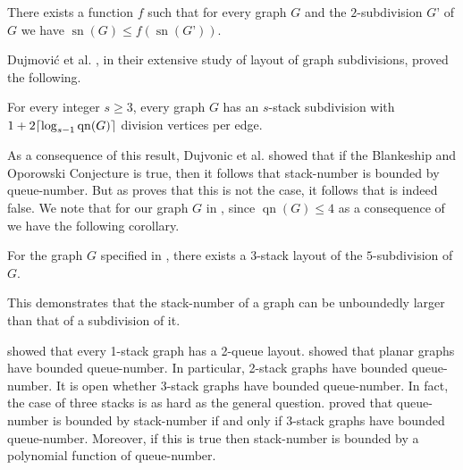 \documentclass[kpfonts]{patmorin}
\DeclareMathOperator{\sn}{sn}
\DeclareMathOperator{\qn}{qn}
\renewcommand{\leq}{\leqslant}
\renewcommand{\geq}{\geqslant}
\begin{document}
\begin{conj}\label{B_conj}\citep{BO99,BO01}
	There exists a function $f$ such that for every graph $G$ and the $2$-subdivision $G’$ of $G$ we have $\sn(G) \leq f(\sn(G’))$.
\end{conj}

Dujmovi\'c et al. \cite{DujWoo05}, in their extensive study of layout of graph subdivisions, proved the following.

\begin{thm}\label{sub_thm} \cite{DujWoo05}
	For every integer $s \geq 3$, every graph $G$ has an $s$-stack subdivision with $1+2 \ceil{\log_{s-1}\qn(G)}$ division vertices per edge.
\end{thm}


As a consequence of this result, Dujvonic et al. showed that if the Blankeship and Oporowski Conjecture is true, then it follows that stack-number is bounded by queue-number. But as  proves that this is not the case, it follows that  is indeed false. We note that for our graph $G$ in , since $\qn(G) \leq 4$ as a consequence of  we have the following corollary.

\begin{cor}
	For the graph $G$ specified in , there exists a $3$-stack layout of the $5$-subdivision of $G$.
\end{cor}

This demonstrates that the stack-number of a graph can be unboundedly larger than that of a subdivision of it.


%
%
%
%
%



\citet{HLR92} showed that every 1-stack graph has a 2-queue layout. \citet{DJMMUW20} showed that planar graphs have bounded queue-number. In particular, 2-stack graphs have bounded queue-number. It is open whether 3-stack graphs have bounded queue-number. In fact, the case of three stacks is as hard as the general question. \citet{DujWoo05} proved that queue-number is bounded by stack-number if and only if 3-stack graphs have bounded queue-number. Moreover, if this is true then stack-number is bounded by a polynomial function of queue-number.




\end{document}
